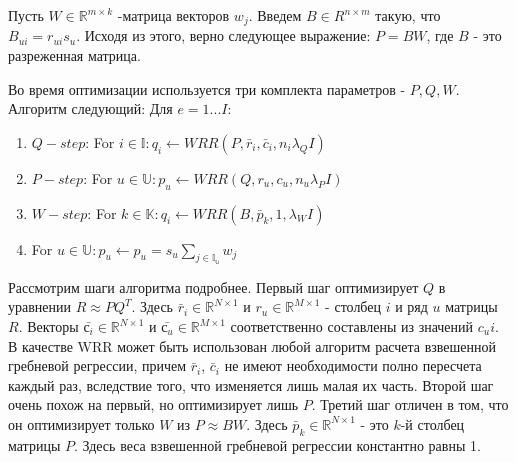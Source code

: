 \documentclass[14pt]{mmcs_article}
\begin{document}
Пусть $W \in \mathbb{R}^{m \times k}$ -матрица векторов $w_j$.  Введем $B \in R^{n \times m}$ такую, что $B_{ui} = r_{ui}s_u$. Исходя из этого, верно следующее выражение: $P = BW$, где $B$ - это разреженная матрица. 

Во время оптимизации используется три комплекта параметров - $P, Q, W$. Алгоритм следующий:
Для $e = 1 ... I$:
\begin{enumerate}
	\item $Q-step$: For $i \in \mathbb{I}: q_i \leftarrow WRR(P, \bar{r}_i, \bar{c}_i,n_i\lambda_QI)$
	\item $P-step$: For $u \in \mathbb{U}: p_u \leftarrow WRR(Q, r_u, c_u,n_u\lambda_PI)$
	\item $W-step$: For $k \in \mathbb{K}: q_i \leftarrow WRR(B, \bar{p}_k, 1 ,\lambda_WI)$
	\item For $u \in \mathbb{U}: p_u \leftarrow p_u = s_u\sum_{j \in \mathbb{I_u}} w_j$
\end{enumerate}

Рассмотрим шаги алгоритма подробнее.
Первый шаг оптимизирует $Q$ в уравнении $R \approx PQ^T$. Здесь $\bar r_i \in \mathbb{R}^{N \times 1}$  и  $r_u \in \mathbb{R}^{M \times 1}$ - столбец $i$ и ряд $u$ матрицы $R$. Векторы $ \bar{с_i} \in \mathbb{R}^{N \times 1}$ и $\bar{с_u} \in \mathbb{R}^{M \times 1}$ соответственно составлены из значений $c_ui$. В качестве WRR может быть использован любой алгоритм расчета взвешенной гребневой регрессии, причем $\bar r_i$, $\bar c_i$ не имеют необходимости полно пересчета каждый раз, вследствие того, что изменяется лишь малая их часть. 
Второй шаг очень похож на первый, но оптимизирует лишь $P$. Третий шаг отличен в том, что он оптимизирует только $W$ из $P \approx BW$. Здесь  $\bar p_k \in \mathbb{R}^{N \times 1}$ - это $k$-й столбец матрицы $P$. Здесь веса взвешенной гребневой регрессии константно равны 1.
\end{document}
